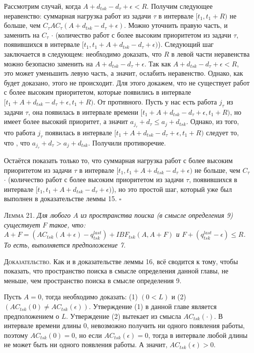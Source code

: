   Рассмотрим случай, когда $A + d_{tsk} - d_{\tau} + \epsilon < R$. Получим следующее неравенство:
    суммарная нагрузка работ из задачи $\tau$ в интервале $[t_1, t_1 + R)$
      не больше, чем $C_{\tau}AC_{\tau}(A + d_{tsk} - d_{\tau} + \epsilon)$.
    Можно уточнить правую часть, и заменить на
      $C_{\tau}$ $\cdot$ (количество работ с более высоким приоритетом из задачи $\tau$,
        появившихся в интервале $[t_1, t_1 + A + d_{tsk} - d_{\tau} + \epsilon)$).
  Следующий шаг заключается в следующем: необходимо доказать, что $R$ в левой части неравенства
    можно безопасно заменить на $A + d_{tsk} - d_{\tau} + \epsilon$. Так как $A + d_{tsk} - d_{\tau} + \epsilon < R$,
    это может уменьшить левую часть, а значит, ослабить неравенство. Однако, как будет доказано,
    этого не происходит.
  Для этого докажем, что не существует работ с более высоким приоритетом, которые появились
    в интервале $[t_1 + A + d_{tsk} - d_{\tau} + \epsilon, t_1 + R)$.
  От противного. Пусть у нас есть работа $j_{\tau}$ из задачи $\tau$, она появилась
    в интервале времени $[t_1 + A + d_{tsk} - d_{\tau} + \epsilon, t_1 + R)$, но
    имеет более высокий приоритет, а значит $a_{j_{\tau}} + d_{\tau} \leq a_{j} + d_{tsk}$.
  Однако, из того, что работа $j_{\tau}$ появилась в интервале $[t_1 + A + d_{tsk} - d_{\tau} + \epsilon, t_1 + R)$
    следует то, что , что $a_{j_{\tau}} + d_{\tau} > a_{j} + d_{tsk}$. Получили противоречие.

  Остаётся показать только то, что суммарная нагрузка работ с более высоким приоритетом
    из задачи $\tau$ в интервале $[t_1, t_1 + A + d_{tsk} - d_{\tau} + \epsilon)$ не больше, чем
    $C_{\tau}$ $\cdot$ (количество работ с более высоким приоритетом из задачи $\tau$,
        появившихся в интервале $[t_1, t_1 + A + d_{tsk} - d_{\tau} + \epsilon)$),
    но это простой шаг, который уже был выполнен в доказательстве леммы 15.
$\square$


\textsc{Лемма 21.}
\textit{Для любого $A$ из пространства поиска (в смысле определения 9)
  существует $F$ такое, что:
    $A + F = (AC_{tsk}(A + \epsilon) - q_{tsk}^{last}) + IBF_{tsk}(A, A + F)$
    и $F + (q_{tsk}^{last} - \epsilon) \leq R$.
  То есть, выполняется предположение 7. }

\textsc{Доказательство.}
  Как и в доказательстве леммы 16, всё сводится к тому, чтобы показать,
    что пространство поиска в смысле определения данной главы, не меньше,
    чем пространство поиска в смысле определения 9.

  Пусть $A = 0$, тогда необходимо доказать:
    (1) $(0 < L)$ и (2) $(AC_{tsk}(0) \neq AC_{tsk}(\epsilon))$.
  Утверждение (1) в данной главе является предположением о $L$.
  Утверждение (2) вытекает из смысла $AC_{tsk}(\cdot)$. В интервале времени длины 0,
    невозможно получить ни одного появления работы, поэтому $AC_{tsk}(0) = 0$,
    но если $AC_{tsk}(\epsilon) = 0$, тогда в интервале любой длины не может
    быть ни одного появления работы. А значит, $AC_{tsk}(\epsilon) > 0$.


